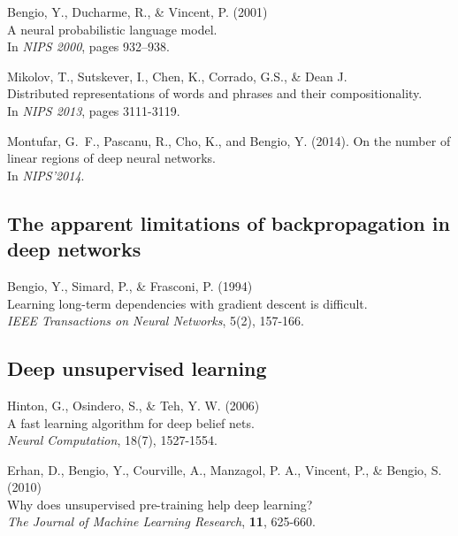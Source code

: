 \documentclass[]{article}
\begin{document}
Bengio, Y., Ducharme, R., \& Vincent, P. (2001)\\ A neural probabilistic
language model.\\ In {\it NIPS 2000}, pages 932--938.


Mikolov, T., Sutskever, I., Chen, K., Corrado, G.S., \& Dean
J.\\ Distributed representations of words and phrases and their
compositionality.\\ In {\it NIPS 2013}, pages 3111-3119.

Montufar, G.~F., Pascanu, R., Cho, K., and Bengio, Y. (2014).  On the
number of linear regions of deep neural networks.\\ In {\it NIPS'2014}.

\subsection{The apparent limitations of backpropagation in deep networks}

Bengio, Y., Simard, P., \& Frasconi, P. (1994)\\ Learning long-term
dependencies with gradient descent is difficult.\\ {\it IEEE Transactions
  on Neural Networks}, 5(2), 157-166.


\subsection{Deep unsupervised learning}
Hinton, G., Osindero, S., \& Teh, Y. W. (2006)\\ A fast learning algorithm
for deep belief nets.\\ {\it Neural Computation}, 18(7), 1527-1554.

Erhan, D., Bengio, Y., Courville, A., Manzagol, P. A., Vincent, P., \&
Bengio, S. (2010)\\ Why does unsupervised pre-training help deep
learning?\\ {\it The Journal of Machine Learning Research}, {\bf 11},
625-660.
\end{document}
